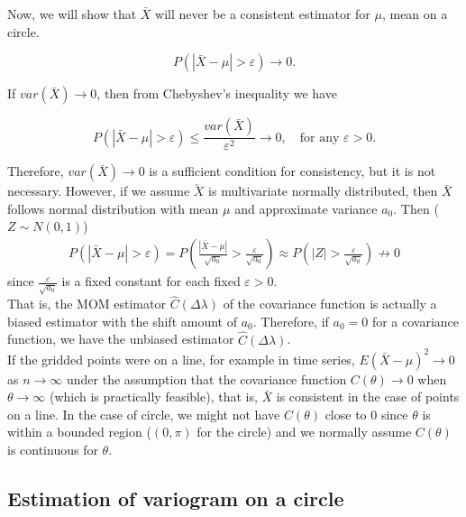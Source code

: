 
Now, we will show that $\bar{X}$ will never be a consistent estimator for $\mu$, mean on a circle. 

\[
	P(|\bar{X} - \mu| > \varepsilon) \to 0.
\]  

If $var(\bar{X}) \to 0$, then from Chebyshev's inequality we have 

\[
	P(|\bar{X} - \mu| > \varepsilon) \le \frac{var(\bar{X})}{\varepsilon^2} \to 0, \quad \mbox{for any $\varepsilon > 0$}.
\]

Therefore, $var(\bar{X}) \to 0$ is a sufficient condition for consistency, but it is not necessary. However, if we assume $\utilde{X}$ is multivariate normally distributed, then $\bar{X}$ follows normal distribution with mean $\mu$ and approximate variance $a_0$. Then ($Z \sim N(0, 1)$)
\begin{eqnarray*}
	P(|\bar{X} - \mu| > \varepsilon) = P\left(\frac{|\bar{X} - \mu|}{\sqrt{a_0}} > \frac{\varepsilon}{\sqrt{a_0}}\right) \approx P\left(|Z| > \frac{\varepsilon}{\sqrt{a_0}}\right) \not\to 0  
\end{eqnarray*}
since $\frac{\varepsilon}{\sqrt{a_0}}$ is a fixed constant for each fixed $\varepsilon > 0$.\\


That is, the MOM estimator $\hat{C}(\Delta \lambda)$ of the covariance function is actually a biased estimator with the shift amount of $a_0$. Therefore, if $a_0 = 0$ for a covariance function, we have the unbiased estimator $\hat{C}(\Delta \lambda)$. \\

If the gridded points were on a line, for example in time series, $E(\bar{X} - \mu)^2 \to 0$ as $n \to \infty$ under the assumption that the covariance function $C(\theta) \to 0$ when $\theta \to \infty$ (which is practically feasible), that is, $\bar{X}$ is consistent in the case of points on a line. In the case of circle, we might not have $C(\theta)$ close to 0 since $\theta$ is within a bounded region ($(0, \pi)$ for the circle) and we normally assume $C(\theta)$ is continuous for $\theta$. \\


\subsection{Estimation of variogram on a circle}


